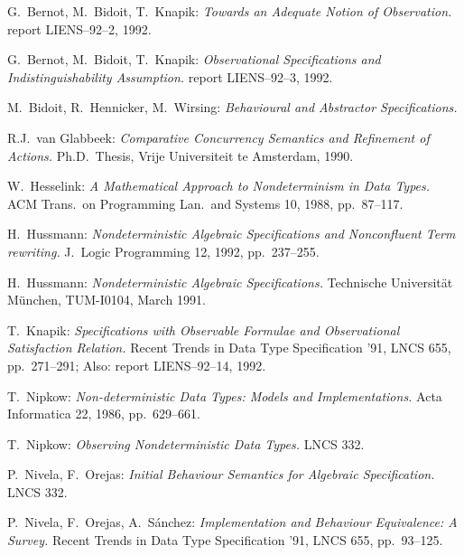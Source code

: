 \begin{thebibliography}{Nip 86}

    G.\ Bernot, M.\ Bidoit, T.\ Knapik: {\em
       Towards an Adequate Notion of Observation.}  report
       LIENS--92--2, 1992.

    G.\ Bernot, M.\ Bidoit, T.\ Knapik: {\em
       Observational Specifications and Indistinguishability
       Assumption.}  report LIENS--92--3, 1992.

    M.\ Bidoit, R.\ Hennicker, M.\ Wirsing:
       {\em Behavioural and Abstractor Specifications.}

    R.J.\ van Glabbeek: {\em Comparative
       Concurrency Semantics and Refinement of Actions.} Ph.D.\
       Thesis, Vrije Universiteit te Amsterdam, 1990.

    W.\ Hesselink: {\em A Mathematical Approach
       to Nondeterminism in Data Types.} ACM Trans.\ on Programming
       Lan.\ and Systems 10, 1988, pp.\ 87--117.

    H.\ Hussmann: {\em Nondeterministic
       Algebraic Specifications and Nonconfluent Term rewriting.} J.\
       Logic Programming 12, 1992, pp.\ 237--255.

    H.\ Hussmann: {\em Nondeterministic
       Algebraic Specifications.} Technische Universit\"{a}t
       M\"{u}nchen, TUM-I0104, March 1991.

    T.\ Knapik: {\em Specifications with
       Observable Formulae and Observational Satisfaction Relation.}
       Recent Trends in Data Type Specification '91, LNCS 655, pp.\
       271--291; Also: report LIENS--92--14, 1992.
   
   \bibitem[Nip 86]{Nip86} T.\ Nipkow: {\em Non-deterministic Data
       Types: Models and Implementations.} Acta Informatica 22, 1986,
       pp.\ 629--661.

   \bibitem[Nip 87]{Nip87} T.\ Nipkow: {\em Observing Nondeterministic
       Data Types.} LNCS 332.

   \bibitem[NO 87]{NO87} P.\ Nivela, F.\ Orejas: {\em Initial
       Behaviour Semantics for Algebraic Specification.} LNCS 332.

   \bibitem[NOS 87]{NOS87} P.\ Nivela, F.\ Orejas, A.\ S\'{a}nchez:
       {\em Implementation and Behaviour Equivalence: A Survey.}
       Recent Trends in Data Type Specification '91, LNCS 655, pp.\
       93--125.


\end{thebibliography}
